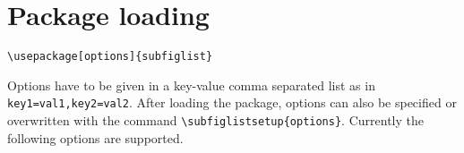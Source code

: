 \documentclass[version=3.12,american]{scrartcl}
\title\customtitle
\author\customauthor
\date{March 22, 2015}
\begin{document}
\maketitle

\tableofcontents

\section{Package loading}

\verb|\usepackage[options]{subfiglist}|

Options have to be given in a key-value comma separated list as in \texttt{key1=val1,key2=val2}. After loading the package, options can also be specified or overwritten with the command \verb|\subfiglistsetup{options}|. Currently the following options are supported.
\end{document}
